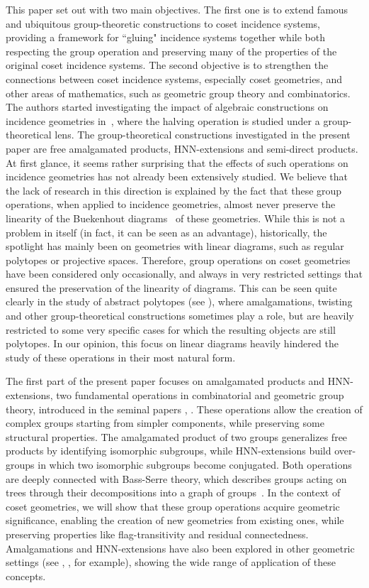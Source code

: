 \documentclass[11pt,letterpaper]{amsart}
\begin{document}
This paper set out with two main objectives. The first one is to extend famous and ubiquitous group-theoretic constructions to coset incidence systems, providing a framework for ``gluing" incidence systems together while both respecting the group operation and
preserving many of the properties of the original coset incidence systems. The second objective is to strengthen the connections between coset incidence systems, especially coset geometries, and other areas of mathematics, such as geometric group theory and combinatorics. The authors started investigating the impact of algebraic constructions on incidence geometries in~\cite{halving}, where the halving operation is studied under a group-theoretical lens. The group-theoretical constructions investigated in the present paper are free amalgamated products, HNN-extensions and semi-direct products. At first glance, it seems rather surprising that the effects of such operations on incidence geometries has not already been extensively studied. 
We believe that the lack of research in this direction is explained by the fact that these group operations, when applied to incidence geometries, almost never preserve the linearity of the Buekenhout diagrams~\cite{buekenhout2013diagram} of these geometries. While this is not a problem in itself (in fact, it can be seen as an advantage), historically, the spotlight has mainly been on geometries with linear diagrams, such as regular polytopes or projective spaces. Therefore, group operations on coset geometries have been considered only occasionally, and always in very restricted settings that ensured the preservation of the linearity of diagrams. This can be seen quite clearly in the study of abstract polytopes (see \cite{ARP}), where amalgamations, twisting and other group-theoretical constructions sometimes play a role, but are heavily restricted to some very specific cases for which the resulting objects are still polytopes. In our opinion, this focus on linear diagrams heavily hindered the study of these operations in their most natural form.

The first part of the present paper focuses on amalgamated products and HNN-extensions, two fundamental operations in combinatorial and geometric group theory, introduced in the seminal papers \cite{neumann1948generalized}, \cite{higman1949embedding}. These operations allow the creation of complex groups starting from simpler components, while preserving some structural properties. The amalgamated product of two groups generalizes free products by identifying isomorphic subgroups, while HNN-extensions build over-groups in which two isomorphic subgroups become conjugated. Both operations are deeply connected with Bass-Serre theory, which describes groups acting on trees through their decompositions into a graph of groups~\cite{serre2002trees}. In the context of coset geometries, we will show that these group operations acquire geometric significance, enabling the creation of new geometries from existing ones, while preserving properties like flag-transitivity and residual connectedness. Amalgamations and HNN-extensions have also been explored in other geometric settings (see \cite{bestvinacombination}, \cite{AnosovAmalgam}, for example), showing the wide range of application of these concepts.
\end{document}
